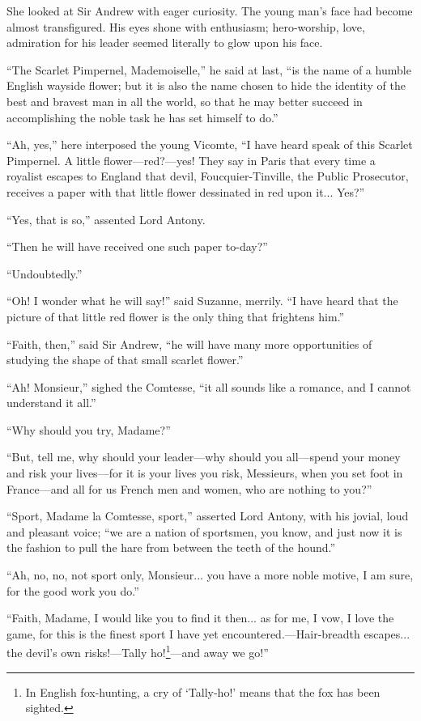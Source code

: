 \documentclass[paper=5.5in:8.5in,BCOR=7mm,twoside,DIV=calc,12pt,usegeometry,chapterprefix,endperiod,headings=big]{scrbook}
\begin{document}
She looked at Sir Andrew with eager curiosity. The young man's face had become almost transfigured. His eyes shone with enthusiasm; hero-worship, love, admiration for his leader seemed literally to glow upon his face.

\enquote{The Scarlet Pimpernel, Mademoiselle,} he said at last, \enquote{is the name of a humble English wayside flower; but it is also the name chosen to hide the identity of the best and bravest man in all the world, so that he may better succeed in accomplishing the noble task he has set himself to do.}

\enquote{Ah, yes,} here interposed the young Vicomte, \enquote{I have heard speak of this Scarlet Pimpernel. A little flower---red?---yes! They say in Paris that every time a royalist escapes to England that devil, Foucquier-Tinville, the Public Prosecutor, receives a paper with that little flower dessinated in red upon it... Yes?}

\enquote{Yes, that is so,} assented Lord Antony.

\enquote{Then he will have received one such paper to-day?}

\enquote{Undoubtedly.}

\enquote{Oh! I wonder what he will say!} said Suzanne, merrily. \enquote{I have heard that the picture of that little red flower is the only thing that frightens him.}

\enquote{Faith, then,} said Sir Andrew, \enquote{he will have many more opportunities of studying the shape of that small scarlet flower.}

\enquote{Ah! Monsieur,} sighed the Comtesse, \enquote{it all sounds like a romance, and I cannot understand it all.}

\enquote{Why should you try, Madame?}

\enquote{But, tell me, why should your leader---why should you all---spend your money and risk your lives---for it is your lives you risk, Messieurs, when you set foot in France---and all for us French men and women, who are nothing to you?}

\enquote{Sport, Madame la Comtesse, sport,} asserted Lord Antony, with his jovial, loud and pleasant voice; \enquote{we are a nation of sportsmen, you know, and just now it is the fashion to pull the hare from between the teeth of the hound.}

\enquote{Ah, no, no, not sport only, Monsieur... you have a more noble motive, I am sure, for the good work you do.}

\enquote{Faith, Madame, I would like you to find it then... as for me, I vow, I love the game, for this is the finest sport I have yet encountered.---Hair-breadth escapes... the devil's own risks!---Tally ho!\footnote{In English fox-hunting, a cry of \enquote{Tally-ho!} means that the fox has been sighted.}---and away we go!}
\end{document}
